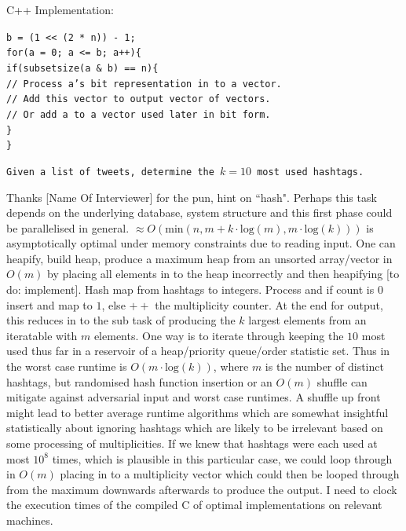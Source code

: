 C++ Implementation:

\texttt{b = (1 << (2 * n)) - 1;} \\
\texttt{for(a = 0; a <= b; a++)\{} \\
\phantom{xxxx}\texttt{if(subsetsize(a \& b) == n)\{} \\
\phantom{xxxxxxxx}\texttt{// Process a's bit representation in to a vector.} \\
\phantom{xxxxxxxx}\texttt{// Add this vector to output vector of vectors.} \\
\phantom{xxxxxxxx}\texttt{// Or add a to a vector used later in bit form.} \\
\phantom{xxxx}\texttt{\}} \\
\texttt{\}}

\texttt{Given a list of tweets, determine the $k=10$ most used hashtags.}

Thanks [Name Of Interviewer] for the pun, hint on ``hash". Perhaps this task depends on the underlying database, system structure and this first phase could be parallelised in general. $\approx O(\text{min}(n,m+k \cdot \text{log}(m),m \cdot \text{log}(k)))$ is asymptotically optimal under memory constraints due to reading input. One can heapify, build heap, produce a maximum heap from an unsorted array/vector in $O(m)$ by placing all elements in to the heap incorrectly and then heapifying [to do: implement]. Hash map from hashtags to integers. Process and if count is $0$ insert and map to $1$, else $++$ the multiplicity counter. At the end for output, this reduces in to the sub task of producing the $k$ largest elements from an iteratable with $m$ elements. One way is to iterate through keeping the $10$ most used thus far in a reservoir of a heap/priority queue/order statistic set. Thus in the worst case runtime is $O(m \cdot \text{log}(k))$, where $m$ is the number of distinct hashtags, but randomised hash function insertion or an $O(m)$ shuffle can mitigate against adversarial input and worst case runtimes. A shuffle up front might lead to better average runtime algorithms which are somewhat insightful statistically about ignoring hashtags which are likely to be irrelevant based on some processing of multiplicities. If we knew that hashtags were each used at most $10^8$ times, which is plausible in this particular case, we could loop through in $O(m)$ placing in to a multiplicity vector which could then be looped through from the maximum downwards afterwards to produce the output. I need to clock the execution times of the compiled C of optimal implementations on relevant machines.

